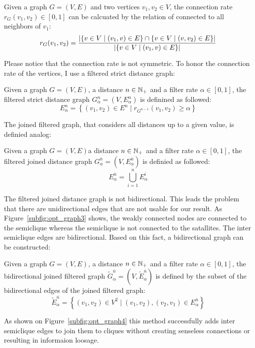 \begin{envdef}
	Given a graph $G=(V,E)$ and two vertices $v_1,v_2 \in V$, the connection rate $r_G(v_1,v_2) \in \left[0,1\right]$ can be calcuated by the relation of connected to all neighbors of $v_1$:
	\begin{equation}
		r_G(v_1,v_2) = \frac{
			\left| \left\{ v \in V \mid (v_1, v) \in E \right\} \cap \left\{ v \in V \mid (v,v_2) \in E \right\} \right|
		}{
			\left| \left\{ v \in V \mid (v_1, v) \in E \right\} \right|
		}
	\end{equation}
\end{envdef}
Please notice that the connection rate is not symmetric. To honor the connection rate of the vertices, I use a filtered strict distance graph:
\begin{envdef}
	Given a graph $G=(V,E)$, a distance $n \in \mathbb{N}_+$ and a filter rate $\alpha \in \left[0,1\right]$, the filtered strict distance graph $G_\alpha^n=(V,E_\alpha^n)$ is definined as followed:
	\begin{equation}
		E_\alpha^n = \left\{ (v_1,v_2) \in E^n \mid r_{G^{n-1}}(v_1,v_2) \geq \alpha \right\}
	\end{equation}
\end{envdef}
The joined filtered graph, that considers all distances up to a given value, is definied analog:
\begin{envdef}
	Given a graph $G=(V,E)$a distance $n \in \mathbb{N}_+$ and a filter rate $\alpha \in \left[0,1\right]$, the filtered joined distance graph $G_\alpha^{\overline{n}}=(V,E_\alpha^{\overline{n}})$ is definied as followed:
	\begin{equation}
		E_\alpha^{\overline{n}} = \bigcup_{i=1}^n E_\alpha^i
	\end{equation}
\end{envdef}
The filtered joined distance graph is not bidirectional. This leads the problem that there are unidirectional edges that are not usable for our result. As Figure~\ref{subfig:opt_graph3} shows, the weakly connected nodes are connected to the semiclique whereas the semiclique is not connected to the satallites. The inter semiclique edges are bidirectional. Based on this fact, a bidirectional graph can be constructed:
\begin{envdef}
	Given a graph $G=(V,E)$, a distance $n \in \mathbb{N}_+$ and a filter rate $\alpha \in \left[0,1\right]$, the bidirectional joined filtered graph $\tilde{G}_\alpha^{\overline{n}}=(V,\tilde{E}_\alpha^{\overline{n}})$ is defined by the subset of the bidirectional edges of the joined filtered graph:
	\begin{equation}
		\tilde{E}_\alpha^{\overline{n}} = \left\{ (v_1,v_2) \in V^2 \mid (v_1,v_2),(v_2,v_1) \in E_\alpha^{\overline{n}} \right\}
	\end{equation}
\end{envdef}
As shown on Figure~\ref{subfig:opt_graph4} this method successfully adds inter semiclique edges to join them to cliques without creating senseless connections or resulting in informaion loosage.

